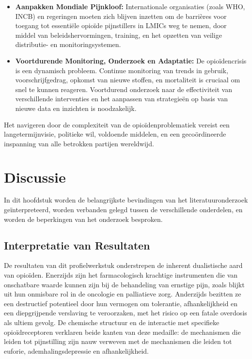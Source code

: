 \documentclass[11pt, a4paper]{report} %
\begin{document}
\begin{itemize}
    \item \textbf{Aanpakken Mondiale Pijnkloof:} Internationale organisaties (zoals WHO, INCB) en regeringen moeten zich blijven inzetten om de barrières voor toegang tot essentiële opioïde pijnstillers in LMICs weg te nemen, door middel van beleidshervormingen, training, en het opzetten van veilige distributie- en monitoringsystemen.
    \item \textbf{Voortdurende Monitoring, Onderzoek en Adaptatie:} De opioïdencrisis is een dynamisch probleem. Continue monitoring van trends in gebruik, voorschrijfgedrag, opkomst van nieuwe stoffen, en mortaliteit is cruciaal om snel te kunnen reageren. Voortdurend onderzoek naar de effectiviteit van verschillende interventies en het aanpassen van strategieën op basis van nieuwe data en inzichten is noodzakelijk.
\end{itemize}
Het navigeren door de complexiteit van de opioïdenproblematiek vereist een langetermijnvisie, politieke wil, voldoende middelen, en een gecoördineerde inspanning van alle betrokken partijen wereldwijd.


\chapter{Discussie}
\label{chap:discussie}

In dit hoofdstuk worden de belangrijkste bevindingen van het literatuuronderzoek geïnterpreteerd, worden verbanden gelegd tussen de verschillende onderdelen, en worden de beperkingen van het onderzoek besproken.

\section{Interpretatie van Resultaten}
De resultaten van dit profielwerkstuk onderstrepen de inherent dualistische aard van opioïden. Enerzijds zijn het farmacologisch krachtige instrumenten die van onschatbare waarde kunnen zijn bij de behandeling van ernstige pijn, zoals blijkt uit hun onmisbare rol in de oncologie en palliatieve zorg. Anderzijds bezitten ze een destructief potentieel door hun vermogen om tolerantie, afhankelijkheid en een diepgrijpende verslaving te veroorzaken, met het risico op een fatale overdosis als ultiem gevolg. De chemische structuur en de interactie met specifieke opioïdreceptoren verklaren beide kanten van deze medaille: de mechanismen die leiden tot pijnstilling zijn nauw verweven met de mechanismen die leiden tot euforie, ademhalingsdepressie en afhankelijkheid.
\end{document}
